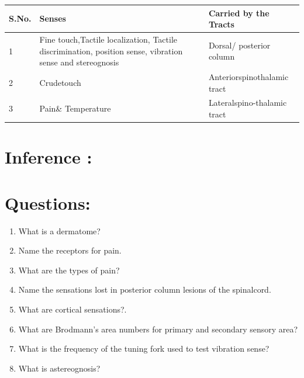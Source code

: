 \documentclass[a4paper,12pt,openany,oneside]{book}
\begin{document}
	\begin{table}[H]
\centering
		\begin{tabular}{|p{1in}|p{1.75in}|p{1.75in}|}
\hline
S.No. & \textbf{Senses}                                                                                       & \textbf{Carried by the Tracts}  \\
\hline
1     & Fine touch,Tactile localization, Tactile discrimination, position sense, vibration sense and stereognosis & Dorsal/ posterior column       \\
\hline
2     & Crudetouch                                                                                            & Anteriorspinothalamic tract    \\
\hline
3     & Pain\& Temperature                                                                                    & Lateralspino-thalamic tract    \\
\hline
\end{tabular}
\end{table}

\section*{Inference :}
\vspace{2in}



\section*{Questions:}
\begin{enumerate}
\item{What is a dermatome?}
\item{Name the receptors for pain.}
\item{What are the types of pain?}
\item{Name the sensations lost in posterior column lesions of the spinalcord.}
\item{What are cortical sensations?.}
\item{What are Brodmann’s area numbers for primary and secondary sensory area?}
\item{What is the frequency of the tuning fork used to test vibration sense?}
\item{What is astereognosis?}
\end{enumerate}
\end{document}
